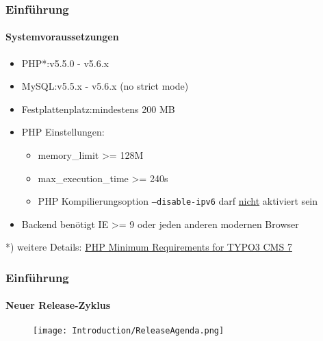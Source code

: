 
\begin{frame}[fragile]
	\frametitle{Einführung}
	\framesubtitle{Systemvoraussetzungen}

	\begin{itemize}
		\item PHP*:\tabto{3cm}v5.5.0 - v5.6.x
		\item MySQL:\tabto{3cm}v5.5.x - v5.6.x (no strict mode)
		\item Festplattenplatz:\tabto{3cm}mindestens 200 MB
		\item PHP Einstellungen:

			\begin{itemize}
				\item memory\_limit >= 128M
				\item max\_execution\_time >= 240s
				\item PHP Kompilierungsoption \texttt{--disable-ipv6} darf \underline{nicht} aktiviert sein
			\end{itemize}

		\item Backend benötigt IE >= 9 oder jeden anderen modernen Browser

	\end{itemize}

	\vspace{1cm}
	*) weitere Details: \href{http://typo3.org/news/article/php-minimum-requirements-for-typo3-cms-7/}{PHP Minimum Requirements for TYPO3 CMS 7}

\end{frame}


\begin{frame}[fragile]
	\frametitle{Einführung}
	\framesubtitle{Neuer Release-Zyklus}

	\begin{figure}
		\texttt{[image: Introduction/ReleaseAgenda.png]}
	\end{figure}

\end{frame}

